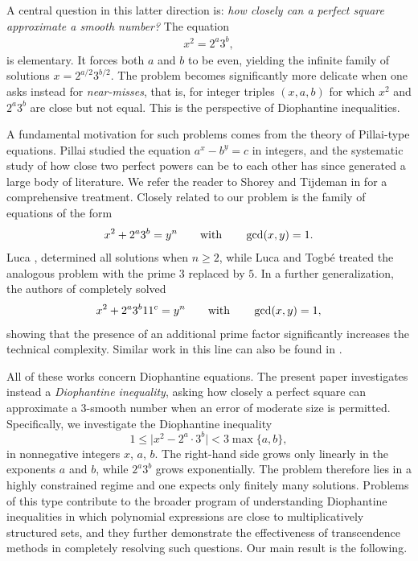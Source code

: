 \documentclass[11pt,a4paper]{article}
\numberwithin{equation}{section}
\numberwithin{table}{section}
\numberwithin{figure}{section}
\begin{document}
A central question in this latter direction is: \emph{how closely can a perfect square approximate a smooth number?} The equation
\begin{align}\label{eq:elem}
x^{2} = 2^{a}3^{b},
\end{align}
is elementary. It forces both $a$ and $b$ to be even, yielding the infinite family of solutions $x = 2^{a/2}3^{b/2}$. The problem becomes significantly more delicate when one asks instead for \emph{near-misses},
that is, for integer triples $(x,a,b)$ for which $x^{2}$ and $2^{a}3^{b}$ are close but not equal. This is the perspective of Diophantine inequalities.

A fundamental motivation for such problems comes from the theory of Pillai-type equations. Pillai \cite{Pillai1936} studied the equation $a^{x} - b^{y} = c$ in integers, and the systematic study of how close two perfect powers can be to each other has since generated a large body of literature. We refer the reader to Shorey and Tijdeman in \cite{ShoreyTijdeman1986} for a comprehensive treatment. 
Closely related to our problem is the family of equations of the form
\begin{align*}
x^{2} + 2^{a}3^{b} = y^{n}\qquad {\text{\rm with}}\qquad \gcd(x,y)=1.
\end{align*}
Luca \cite{Luca2002}, determined all solutions when $n\geq 2$, while Luca and Togb\'e \cite{LucaTogbe2008} treated the analogous problem with the prime $3$ replaced by $5$. In a further generalization, the authors of \cite{cangul2013diophantine} completely solved
\begin{align*}
x^{2} + 2^{a}3^{b}11^{c} = y^{n}\qquad  {\text{\rm with}}\qquad \gcd(x,y)=1,
\end{align*}
showing that the presence of an additional prime factor significantly increases the technical complexity. Similar work in this line can also be found in \cite{gica2012diophantine}. 

All of these works concern Diophantine equations. The present paper investigates instead a \emph{Diophantine inequality}, asking how closely a perfect square can approximate a 3-smooth number when an error
of moderate size is permitted. Specifically, we investigate the Diophantine inequality
\begin{equation}\label{eq:ineq}
	1\le \lvert x^{2} - 2^{a}\cdot 3^{b}\rvert < 3\max\{a,b\},
\end{equation}
in nonnegative integers $x$, $a$, $b$. The right-hand side grows only linearly in the exponents $a$ and $b$, while $2^{a}3^{b}$ grows exponentially. The problem therefore lies in a highly constrained regime and one expects only finitely many solutions.
 Problems of this type contribute to the broader program of understanding Diophantine inequalities in which polynomial expressions are close to multiplicatively structured
sets, and they further demonstrate the effectiveness of transcendence methods in completely resolving such questions.
Our main result is the following.
\end{document}
